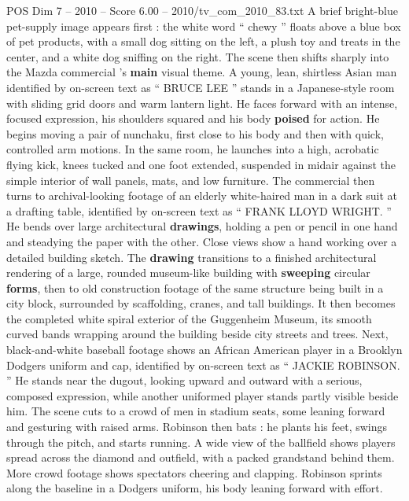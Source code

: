 \begin{textsample}{POS Dim 7 – 2010 – Score 6.00 – 2010/tv\_com\_2010\_83.txt}  \label{ex:f7_pos_060}
A brief bright-blue pet-supply image appears first : the white word “ chewy ” floats above a blue box of pet products, with a small dog sitting on the left, a plush toy and treats in the center, and a white dog sniffing on the right.
The scene then shifts sharply into the Mazda commercial ’s \textbf{main} visual theme.
A young, lean, shirtless Asian man identified by on-screen text as “ BRUCE LEE ” stands in a Japanese-style room with sliding grid doors and warm lantern light.
He faces forward with an intense, focused expression, his shoulders squared and his body \textbf{poised} for action.
He begins moving a pair of nunchaku, first close to his body and then with quick, controlled arm motions.
In the same room, he launches into a high, acrobatic flying kick, knees tucked and one foot extended, suspended in midair against the simple interior of wall panels, mats, and low furniture.
The commercial then turns to archival-looking footage of an elderly white-haired man in a dark suit at a drafting table, identified by on-screen text as “ FRANK LLOYD WRIGHT. ” He bends over large architectural \textbf{drawings}, holding a pen or pencil in one hand and steadying the paper with the other.
Close views show a hand working over a detailed building sketch.
The \textbf{drawing} transitions to a finished architectural rendering of a large, rounded museum-like building with \textbf{sweeping} circular \textbf{forms}, then to old construction footage of the same structure being built in a city block, surrounded by scaffolding, cranes, and tall buildings.
It then becomes the completed white spiral exterior of the Guggenheim Museum, its smooth curved bands wrapping around the building beside city streets and trees.
Next, black-and-white baseball footage shows an African American player in a Brooklyn Dodgers uniform and cap, identified by on-screen text as “ JACKIE ROBINSON. ” He stands near the dugout, looking upward and outward with a serious, composed expression, while another uniformed player stands partly visible beside him.
The scene cuts to a crowd of men in stadium seats, some leaning forward and gesturing with raised arms.
Robinson then bats : he plants his feet, swings through the pitch, and starts running.
A wide view of the ballfield shows players spread across the diamond and outfield, with a packed grandstand behind them.
More crowd footage shows spectators cheering and clapping.
Robinson sprints along the baseline in a Dodgers uniform, his body leaning forward with effort.

\end{textsample}
